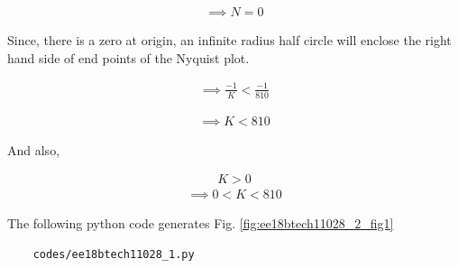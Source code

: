 \begin{enumerate}[label=\thesection.\arabic*.,ref=\thesection.\theenumi]
\begin{align}
    \implies N = 0
\end{align}




Since, there is a zero at origin, an infinite radius half circle will enclose the right hand side of end points of the Nyquist plot.

\begin{align}
    \implies \frac{-1}{K} < \frac{-1}{810}
\end{align}

\begin{align}
    \implies K < 810
\end{align}

And also,

\begin{align}
    K > 0
\end{align}
\begin{align}
    \implies 0 < K < 810     
\end{align}


The following python code generates  Fig. \ref{fig:ee18btech11028_2_fig1}
\begin{lstlisting}
    codes/ee18btech11028_1.py
\end{lstlisting}
\end{enumerate}